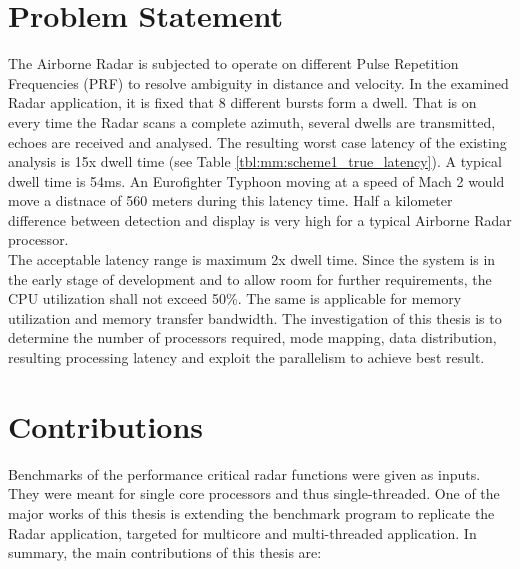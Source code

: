 \section{Problem Statement}
\label{sec:intro:probstatement}
The Airborne Radar is subjected to operate on different Pulse Repetition Frequencies (PRF) to resolve ambiguity in distance and velocity. In the examined Radar application, it is fixed that 8 different bursts form a dwell. That is on every time the Radar scans a complete azimuth, several dwells are transmitted, echoes are received and analysed. The resulting worst case latency of the existing analysis is 15x dwell time (see Table \ref{tbl:mm:scheme1_true_latency}).  A typical dwell time is 54ms. An Eurofighter Typhoon moving at a speed of Mach 2 would move a distnace of 560 meters during this latency time. Half a kilometer difference between detection and display is very high for a typical Airborne Radar processor. \\

The acceptable latency range is maximum 2x dwell time. Since the system is in the early stage of development and to allow room for further requirements, the CPU utilization shall not exceed 50\%. The same is applicable for memory utilization and memory transfer bandwidth. The investigation of this thesis is to determine the number of processors required, mode mapping, data distribution, resulting processing latency and exploit the parallelism to achieve best result.

\section{Contributions}
\label{sec:intro:contrib}
Benchmarks of the performance critical radar functions were given as inputs. They were meant for single core processors and thus single-threaded. One of the major works of this thesis is extending the benchmark program to replicate the Radar application, targeted for multicore and multi-threaded application.
In summary, the main contributions of this thesis are:

